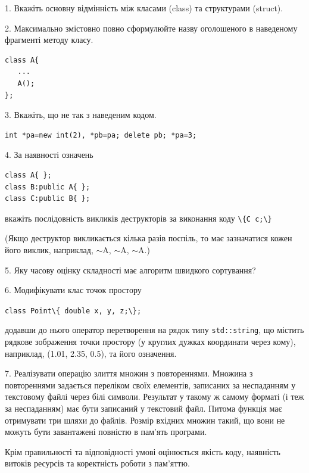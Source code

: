 \documentclass[12pt, ukrainian]{article}
\def\code#1{\Verb!#1!}
\begin{document}
{%
1. Вкажіть основну відмінність між класами (class) та структурами (struct).%
\par
\vspace{2mm}
2. Максимально змістовно повно сформулюйте назву оголошеного в наведеному фрагменті методу класу.
\vspace{-3mm}
\begin{verbatim}class A{
   ...
   A();
};\end{verbatim}
\vspace{-3mm}
\par
\vspace{2mm}
3. Вкажіть, що не так з наведеним кодом.
\vspace{-3mm}
\begin{verbatim}int *pa=new int(2), *pb=pa; delete pb; *pa=3;\end{verbatim}
\vspace{-3mm}
\par
\vspace{2mm}
4. За наявності означень
\vspace{-3mm}
\begin{verbatim}
class A{ };
class B:public A{ };
class C:public B{ };\end{verbatim}
\vspace{-3mm}
вкажіть послідовність викликів деструкторів за виконання коду \code{\{C c;\}} 

(Якщо деструктор викликається кілька разів поспіль, то має зазначатися кожен його виклик, наприклад, $\sim$A, $\sim$A, $\sim$A.)

\vspace{2mm}
5. Яку часову оцінку складності має алгоритм швидкого сортування?
\par
\vspace{2mm}
6. Модифікувати клас точок простору 

\qquad\code{class Point\{ double x, y, z;\};}


додавши до нього оператор перетворення на рядок типу \code{std::string}, що містить рядкове зображення точки простору (у круглих дужках координати через кому), наприклад, (1.01, 2.35, 0.5), та його означення.%
\par
\vspace{2mm}
7. 
Реалізувати операцію злиття множин з повтореннями. Множина з повтореннями задається переліком своїх елементів, записаних за неспаданням у текстовому файлі через білі символи. Результат у такому ж самому форматі (і теж за неспаданням) має бути записаний у текстовий файл. Питома функція має отримувати три шляхи до файлів. Розмір вхідних множин такий, що вони не можуть бути завантажені повністю в пам’ять програми.

Крім правильності та відповідності умові оцінюється якість коду, наявність витоків ресурсів та коректність роботи з пам'яттю. 

}
\end{document}
